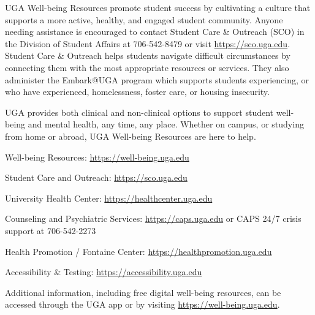 UGA Well-being Resources promote student success by cultivating a culture that supports a more active, healthy, and engaged student community. Anyone needing assistance is encouraged to contact Student Care \& Outreach (SCO) in the Division of Student Affairs at 706-542-8479 or visit \href{https://sco.uga.edu}{https://sco.uga.edu}. Student Care \& Outreach helps students navigate difficult circumstances by connecting them with the most appropriate resources or services. They also administer the Embark@UGA program which supports students experiencing, or who have experienced, homelessness, foster care, or housing insecurity.

UGA provides both clinical and non-clinical options to support student well-being and mental health, any time, any place. Whether on campus, or studying from home or abroad, UGA Well-being Resources are here to help.

\begin{ul}
    \item Well-being Resources: \href{https://well-being.uga.edu}{https://well-being.uga.edu}
    \item Student Care and Outreach: \href{https://sco.uga.edu}{https://sco.uga.edu}
    \item University Health Center: \href{https://healthcenter.uga.edu}{https://healthcenter.uga.edu}
    \item Counseling and Psychiatric Services: \href{https://caps.uga.edu}{https://caps.uga.edu} or CAPS 24/7 crisis support at 706-542-2273
    \item Health Promotion / Fontaine Center: \href{https://healthpromotion.uga.edu}{https://healthpromotion.uga.edu}
    \item Accessibility \& Testing: \href{https://accessibility.uga.edu}{https://accessibility.uga.edu}
\end{ul}
Additional information, including free digital well-being resources, can be accessed through the UGA app or by visiting \href{https://well-being.uga.edu}{https://well-being.uga.edu}.
